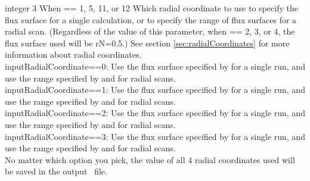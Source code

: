 {integer}
{3}
{When  == 1, 5, 11, or 12}
{Which radial coordinate to use to specify the flux surface for a single calculation,
or to specify the range of flux surfaces for a radial scan. 
(Regardless of the value of this parameter, when  == 2, 3, or 4, the flux surface used will be {\ttfamily rN}=0.5.)
See section \ref{sec:radialCoordinates}
for more information about radial coordinates.\\

{\ttfamily inputRadialCoordinate}==0: Use the flux surface specified by 
for a single run, and use the range specified by  and  for radial scans.\\

{\ttfamily inputRadialCoordinate}==1: Use the flux surface specified by 
for a single run, and use the range specified by  and  for radial scans.\\

{\ttfamily inputRadialCoordinate}==2: Use the flux surface specified by 
for a single run, and use the range specified by  and  for radial scans.\\

{\ttfamily inputRadialCoordinate}==3: Use the flux surface specified by 
for a single run, and use the range specified by  and  for radial scans. \\

No matter which option you pick, the value of all 4 radial coordinates used will be saved in the output \HDF~file.
}

\myhrule

